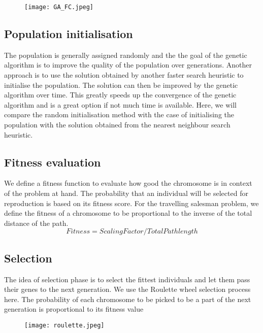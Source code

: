\documentclass{article}
\begin{document}
\begin{figure}[htp]
    \centering
    \texttt{[image: GA\_FC.jpeg]}
\end{figure}


\subsection{Population initialisation}
The population is generally assigned randomly and the the goal of the genetic algorithm is to improve the quality of the population over generations. Another approach is to use the solution obtained by another faster search heuristic to initialise the population. The solution can then be improved by the genetic algorithm over time. This greatly speeds up the convergence of the genetic algorithm and is a great option if not much time is available.
Here, we will compare the random initialisation method with the case of initialising the population with the solution obtained from the nearest neighbour search heuristic. 

\subsection{Fitness evaluation}
We define a fitness function to evaluate how good the chromosome is in context of the problem at hand. The probability that an individual will be selected for reproduction is based on its fitness score. For the travelling salesman problem, we define the fitness of a chromosome to be proportional to the inverse of the total distance of the path. \[Fitness = Scaling Factor/Total Path length\]

\subsection{Selection}
The idea of selection phase is to select the fittest individuals and let them pass their genes to the next generation. We use the Roulette wheel selection process here. The probability of each chromosome to be picked to be a part of the next generation is proportional to its fitness value
\begin{figure}[htp]
    \centering
    \texttt{[image: roulette.jpeg]}
\end{figure}
\end{document}
